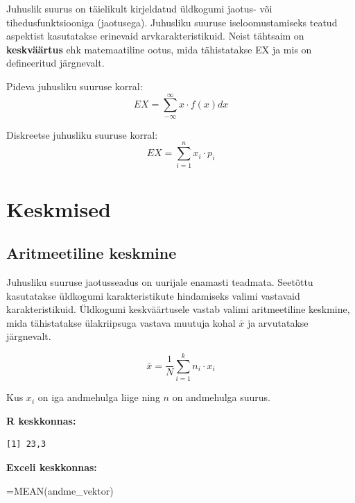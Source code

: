 \documentclass[
]{book}
\newenvironment{Shaded}{\begin{snugshade}}{\end{snugshade}}
\newcommand{\CommentTok}[1]{\textcolor[rgb]{0.56,0.35,0.01}{\textit{#1}}}
\newcommand{\FunctionTok}[1]{\textcolor[rgb]{0.13,0.29,0.53}{\textbf{#1}}}
\newcommand{\NormalTok}[1]{#1}
\newcommand{\OtherTok}[1]{\textcolor[rgb]{0.56,0.35,0.01}{#1}}
\newcommand{\SpecialCharTok}[1]{\textcolor[rgb]{0.81,0.36,0.00}{\textbf{#1}}}
\newcommand{\StringTok}[1]{\textcolor[rgb]{0.31,0.60,0.02}{#1}}
\renewenvironment{Shaded} {\begin{snugshade}\footnotesize} {\end{snugshade}}
\begin{document}
Juhuslik suurus on täielikult kirjeldatud üldkogumi jaotus- või tihedusfunktsiooniga (jaotusega). Juhusliku suuruse iseloomustamiseks teatud aspektist kasutatakse erinevaid arvkarakteristikuid. Neist tähtsaim on \textbf{keskväärtus} ehk matemaatiline ootus, mida tähistatakse EX ja mis on defineeritud järgnevalt.

Pideva juhusliku suuruse korral:
\[EX = \sum_{-\infty}^{\infty} x \cdot f(x) dx\]

Diskreetse juhusliku suuruse korral:
\[EX = \sum_{i=1}^{n} x_i \cdot p_i\]

\section{Keskmised}\label{keskmised}

\subsection{Aritmeetiline keskmine}\label{aritmeetiline-keskmine}

Juhusliku suuruse jaotusseadus on uurijale enamasti teadmata. Seetõttu kasutatakse üldkogumi karakteristikute hindamiseks valimi vastavaid karakteristikuid. Üldkogumi keskväärtusele vastab valimi aritmeetiline keskmine, mida tähistatakse ülakriipsuga vastava muutuja kohal \(\bar x\) ja arvutatakse järgnevalt.

\[ \bar x=\frac{1}{N}\sum_{i=1}^{k}n_i \cdot x_i \]

Kus \(x_{i}\) on iga andmehulga liige ning \(n\) on andmehulga suurus.

\textbf{R keskkonnas:}

\begin{Shaded}
\end{Shaded}

\begin{verbatim}
[1] 23,3
\end{verbatim}

\textbf{Exceli keskkonnas:}

\begin{Shaded}
\begin{Highlighting}[]
\NormalTok{=MEAN(andme\_vektor)}
\end{Highlighting}
\end{Shaded}
\end{document}
